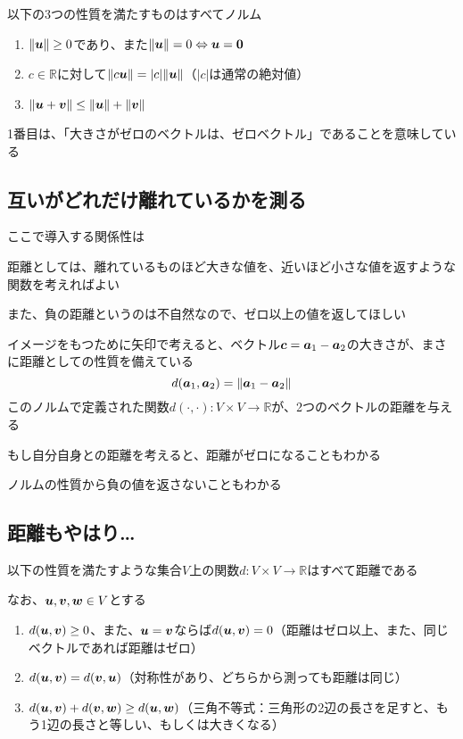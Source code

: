\documentclass[../book_half_step_linear]{subfiles}
\begin{document}
以下の3つの性質を満たすものはすべてノルム
\begin{enumerate}
  \item $\lVert \vb*{u} \rVert \geq 0$であり、また$\lVert \vb*{u} \rVert = 0 \Leftrightarrow \vb*{u} = \vb*{0}$
  \item $c \in \mathbb{R}$に対して$\lVert c\vb*{u} \rVert = |c|\lVert \vb*{u} \rVert$（$|c|$は通常の絶対値）
  \item $\lVert \vb*{u} + \vb*{v} \rVert \leq \lVert \vb*{u} \rVert + \lVert \vb*{v} \rVert$
\end{enumerate}
1番目は、「大きさがゼロのベクトルは、ゼロベクトル」であることを意味している

\sectionline
\subsection{互いがどれだけ離れているかを測る}

ここで導入する関係性は

距離としては、離れているものほど大きな値を、近いほど小さな値を返すような関数を考えればよい

また、負の距離というのは不自然なので、ゼロ以上の値を返してほしい

\br

イメージをもつために矢印で考えると、ベクトル$\vb*{c} = \vb*{a}_1 - \vb*{a}_2$の大きさが、まさに距離としての性質を備えている
\begin{equation*}
  d(\vb*{a}_1, \vb*{a}_2) = \lVert \vb*{a}_1 - \vb*{a}_2 \rVert
\end{equation*}
このノルムで定義された関数$d(\cdot, \cdot): V \times V \to \mathbb{R}$が、2つのベクトルの距離を与える

もし自分自身との距離を考えると、距離がゼロになることもわかる

ノルムの性質から負の値を返さないこともわかる

\sectionline
\subsection{距離もやはり…}

以下の性質を満たすような集合$V$上の関数$d: V \times V \to \mathbb{R}$はすべて距離である

なお、$\vb*{u}, \vb*{v}, \vb*{w} \in V$とする
\begin{enumerate}
  \item $d(\vb*{u}, \vb*{v}) \geq 0$、また、$\vb*{u} = \vb*{v}$ならば$d(\vb*{u}, \vb*{v}) = 0$（距離はゼロ以上、また、同じベクトルであれば距離はゼロ）
  \item $d(\vb*{u}, \vb*{v}) = d(\vb*{v}, \vb*{u})$（対称性があり、どちらから測っても距離は同じ）
  \item $d(\vb*{u},\vb*{v})+d(\vb*{v},\vb*{w})\geq d(\vb*{u},\vb*{w})$（三角不等式：三角形の2辺の長さを足すと、もう1辺の長さと等しい、もしくは大きくなる）
\end{enumerate}
\end{document}
